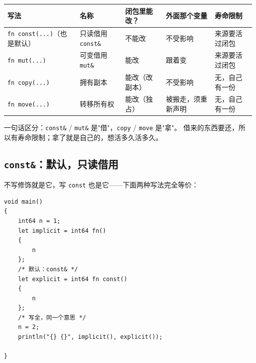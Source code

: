 {\small\setlength{\tabcolsep}{4pt}
\begin{longtable}{>{\raggedright\arraybackslash}p{}>{\raggedright\arraybackslash}p{}>{\raggedright\arraybackslash}p{}>{\raggedright\arraybackslash}p{}>{\raggedright\arraybackslash}p{}}
\toprule
写法 & 名称 & 闭包里能改？ & 外面那个变量 & 寿命限制 \\
\midrule
\endhead
\texttt{fn const(\allowbreak{}.\allowbreak{}.\allowbreak{}.\allowbreak{})\allowbreak{}}（也是默认） & 只读借用 \texttt{const\&} & 不能改 & 不受影响 & 来源要活过闭包 \\
\texttt{fn mut(\allowbreak{}.\allowbreak{}.\allowbreak{}.\allowbreak{})\allowbreak{}} & 可变借用 \texttt{mut\&} & 能改 & 跟着变 & 来源要活过闭包 \\
\texttt{fn copy(\allowbreak{}.\allowbreak{}.\allowbreak{}.\allowbreak{})\allowbreak{}} & 拥有副本 & 能改（改副本） & 不受影响 & 无，自己有一份 \\
\texttt{fn move(\allowbreak{}.\allowbreak{}.\allowbreak{}.\allowbreak{})\allowbreak{}} & 转移所有权 & 能改（独占） & 被搬走，须重新声明 & 无，自己有一份 \\
\bottomrule
\end{longtable}
}

一句话区分：\texttt{const\&} / \texttt{mut\&} 是"借"，\texttt{copy} / \texttt{move} 是"拿"。 借来的东西要还，所以有寿命限制；拿了就是自己的，想活多久活多久。

\subsection{\texttt{const\&}：默认，只读借用}

不写修饰就是它，写 \texttt{const} 也是它——下面两种写法完全等价：

\par
\medskip
\begin{lstlisting}[style=chali]
void main()
{
    int64 n = 1;
    let implicit = int64 fn()
    {
        n
    };
    /* 默认：const& */
    let explicit = int64 fn const()
    {
        n
    };
    /* 写全，同一个意思 */
    n = 2;
    println("{} {}", implicit(), explicit());

}
\end{lstlisting}
\par
\medskip

